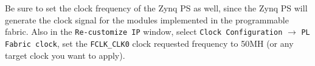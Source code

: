 \documentclass[11pt]{article}
\begin{document}
\begin{center}
\end{center}

\begin{center}
\end{center}

Be sure to set the clock frequency of the Zynq PS as well, since the Zynq PS will generate the clock signal for the modules implemented in the programmable fabric. Also in the \texttt{Re-customize IP} window, select \texttt{Clock Configuration} $\rightarrow$ \texttt{PL Fabric clock}, set the \verb|FCLK_CLK0| clock requested frequency to 50MH (or any target clock you want to apply).

\begin{center}
\end{center}
\end{document}
